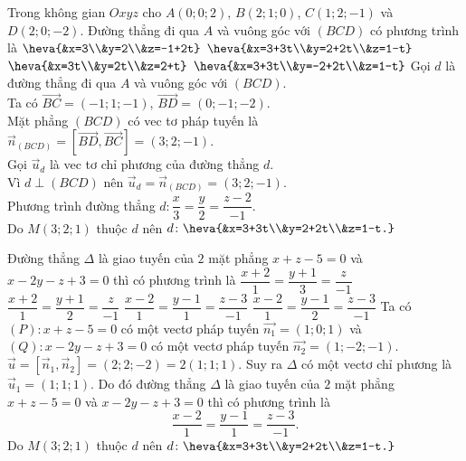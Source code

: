 \begin{ex}%
	Trong không gian $Oxyz$ cho $A(0;0;2)$, $B(2;1;0)$, $C(1;2;-1)$ và $D(2;0;-2)$. Đường thẳng đi qua $A$ và vuông góc với $(BCD)$ có phương trình là
	\choice
	{$\heva{&x=3\\&y=2\\&z=-1+2t}$}
	{\True $\heva{&x=3+3t\\&y=2+2t\\&z=1-t}$}
	{$\heva{&x=3t\\&y=2t\\&z=2+t}$}
	{$\heva{&x=3+3t\\&y=-2+2t\\&z=1-t}$}
	\loigiai
	{
		Gọi $d$ là đường thẳng đi qua $A$ và vuông góc với $(BCD)$.\\
		Ta có $\overrightarrow{BC}=(-1;1;-1)$, $\overrightarrow{BD}=(0;-1;-2)$.\\
		Mặt phẳng $(BCD)$ có vec tơ pháp tuyến là $\vec{n}_{(BCD)}=\left[\overrightarrow{BD},\overrightarrow{BC}\right]=(3;2;-1)$.\\
		Gọi $\vec{u}_{d}$ là vec tơ chỉ phương của đường thẳng $d$.\\
		Vì $d\perp(BCD)$ nên $\overrightarrow{u}_{d}=\vec{n}_{(BCD)}=(3;2;-1)$.\\
		Phương trình đường thẳng $d\colon\dfrac{x}{3}=\dfrac{y}{2}=\dfrac{z-2}{-1}$.\\
		Do $M(3;2;1)$ thuộc $d$ nên $d\colon\heva{&x=3+3t\\&y=2+2t\\&z=1-t.}$
	}
\end{ex}
\begin{ex}%
	Đường thẳng $\Delta$ là giao tuyến của $2$ mặt phẳng $x+z-5=0$ và $x-2y-z+3=0$ thì có phương trình là
	\choice
	{$\dfrac{x+2}{1}=\dfrac{y+1}{3}=\dfrac{z}{-1}$}
	{$\dfrac{x+2}{1}=\dfrac{y+1}{2}=\dfrac{z}{-1}$}
	{\True $\dfrac{x-2}{1}=\dfrac{y-1}{1}=\dfrac{z-3}{-1}$}
	{$\dfrac{x-2}{1}=\dfrac{y-1}{2}=\dfrac{z-3}{-1}$}
	\loigiai
	{
		Ta có $(P)\colon x+z-5=0$ có một vectơ pháp tuyến $\overrightarrow{n_{1}}=(1;0;1)$ và $(Q)\colon x-2y-z+3=0$ có một vectơ pháp tuyến $\overrightarrow{n_{2}}=(1;-2;-1)$.\\
		$\vec{u}=\left[\overrightarrow{n}_{1},\overrightarrow{n}_{2}\right]=(2;2;-2)=2(1;1;1)$.
		Suy ra $\Delta$ có một vectơ chỉ phương là $\vec{u}_{1}=(1;1;1)$.
		Do đó đường thẳng $\Delta$ là giao tuyến của $2$ mặt phẳng $x+z-5=0$ và $x-2y-z+3=0$ thì có phương trình là 
		$$\dfrac{x-2}{1}=\dfrac{y-1}{1}=\dfrac{z-3}{-1}.$$
		Do $M(3;2;1)$ thuộc $d$ nên $d\colon\heva{&x=3+3t\\&y=2+2t\\&z=1-t.}$
	}
\end{ex}
